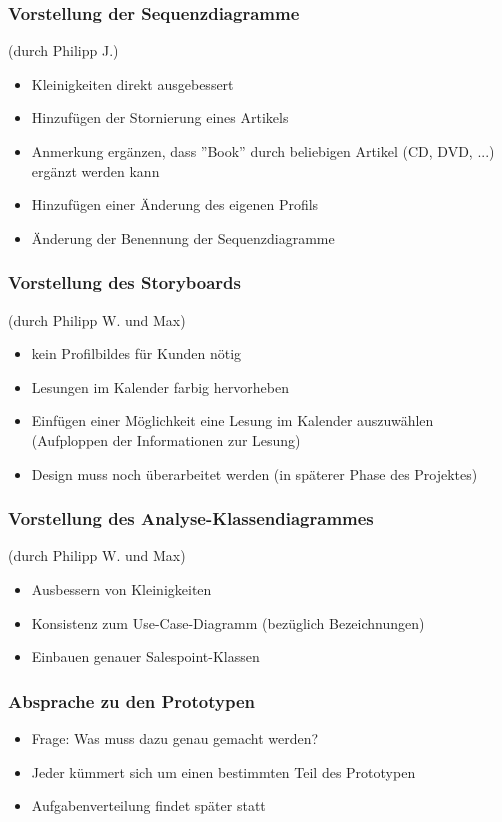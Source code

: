 \documentclass[12pt,a4paper]{article}
\begin{document}
\subsubsection*{Vorstellung der Sequenzdiagramme}
(durch Philipp J.)
\begin{itemize}
\item Kleinigkeiten direkt ausgebessert
\item Hinzufügen der Stornierung eines Artikels
\item Anmerkung ergänzen, dass ''Book'' durch beliebigen Artikel (CD, DVD, ...) ergänzt werden kann
\item Hinzufügen einer Änderung des eigenen Profils
\item Änderung der Benennung der Sequenzdiagramme
\end{itemize}

\subsubsection*{Vorstellung des Storyboards}
(durch Philipp W. und Max)
\begin{itemize}
\item kein Profilbildes für Kunden nötig
\item Lesungen im Kalender farbig hervorheben
\item Einfügen einer Möglichkeit eine Lesung im Kalender auszuwählen (Aufploppen der Informationen zur Lesung)
\item Design muss noch überarbeitet werden (in späterer Phase des Projektes)
\end{itemize}

\subsubsection*{Vorstellung des Analyse-Klassendiagrammes}
(durch Philipp W. und Max)
\begin{itemize}
\item Ausbessern von Kleinigkeiten
\item Konsistenz zum Use-Case-Diagramm (bezüglich Bezeichnungen)
\item Einbauen genauer Salespoint-Klassen
\end{itemize}

\subsubsection*{Absprache zu den Prototypen}
\begin{itemize}
\item Frage: Was muss dazu genau gemacht werden?
\item Jeder kümmert sich um einen bestimmten Teil des Prototypen
\item Aufgabenverteilung findet später statt
\end{itemize}
\end{document}
